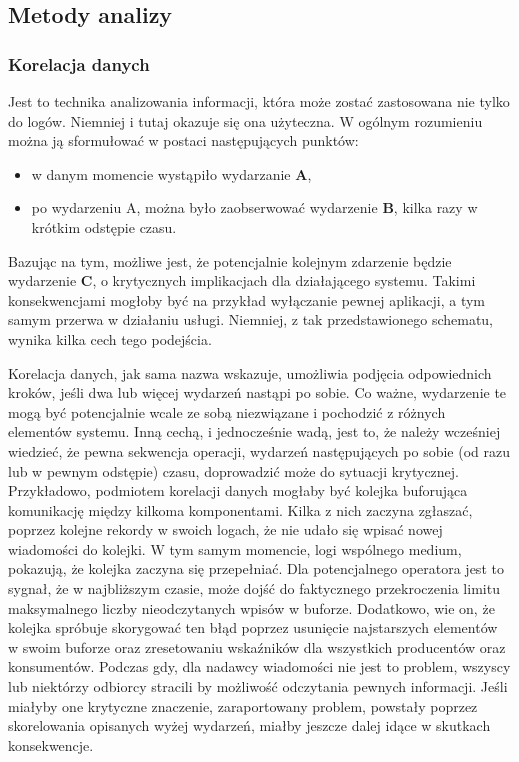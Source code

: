     \subsection{Metody analizy}
    
        \subsubsection{Korelacja danych}
        \label{chapter:logs:analysis:methods:correlation}
        Jest to technika analizowania informacji, która może zostać zastosowana nie tylko do logów. Niemniej
        i tutaj okazuje się ona użyteczna. W ogólnym rozumieniu można ją sformułować w postaci następujących punktów:
        \begin{itemize}
            \item w danym momencie wystąpiło wydarzanie \textbf{A},
            \item po wydarzeniu A, można było zaobserwować wydarzenie \textbf{B}, kilka razy w krótkim odstępie czasu.
        \end{itemize}
        Bazując na tym, możliwe jest, że potencjalnie kolejnym zdarzenie będzie wydarzenie \textbf{C}, o krytycznych
        implikacjach dla działającego systemu. Takimi konsekwencjami mogłoby być na przykład wyłączanie pewnej 
        aplikacji, a tym samym przerwa w działaniu usługi. Niemniej, z tak przedstawionego schematu, wynika kilka cech
        tego podejścia. 
        
        Korelacja danych, jak sama nazwa wskazuje, umożliwia podjęcia odpowiednich kroków, jeśli dwa lub więcej wydarzeń
        nastąpi po sobie. Co ważne, wydarzenie te mogą być potencjalnie wcale ze sobą niezwiązane i pochodzić z różnych
        elementów systemu. Inną cechą, i jednocześnie wadą, jest to, że należy wcześniej wiedzieć, że pewna
        sekwencja operacji, wydarzeń następujących po sobie (od razu lub w pewnym odstępie) czasu, doprowadzić może
        do sytuacji krytycznej. Przykładowo, podmiotem korelacji danych mogłaby być kolejka buforująca 
        komunikację między kilkoma komponentami. Kilka z nich zaczyna zgłaszać, poprzez kolejne rekordy w swoich logach,
        że nie udało się wpisać nowej wiadomości do kolejki. W tym samym momencie, logi wspólnego medium, pokazują, że
        kolejka zaczyna się przepełniać. Dla potencjalnego operatora jest to sygnał, że w najbliższym czasie, może dojść
        do faktycznego przekroczenia limitu maksymalnego liczby nieodczytanych wpisów w buforze. Dodatkowo, wie on, że
        kolejka spróbuje skorygować ten błąd poprzez usunięcie najstarszych elementów w swoim buforze oraz zresetowaniu
        wskaźników dla wszystkich producentów oraz konsumentów. Podczas gdy, dla nadawcy wiadomości nie jest to problem,
        wszyscy lub niektórzy odbiorcy stracili by możliwość odczytania pewnych informacji. Jeśli miałyby one
        krytyczne znaczenie, zaraportowany problem, powstały poprzez skorelowania opisanych wyżej wydarzeń, miałby jeszcze
        dalej idące w skutkach konsekwencje.
        

